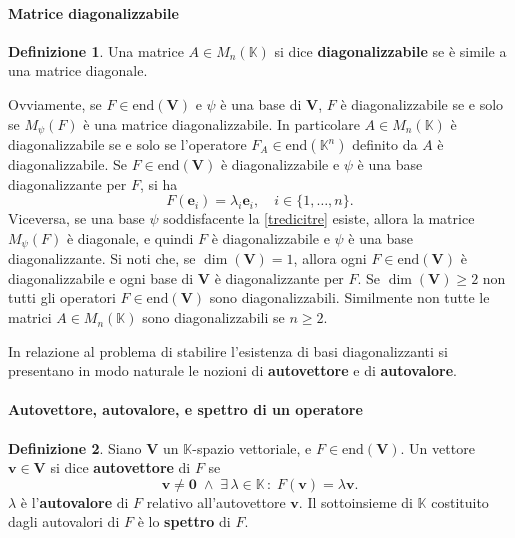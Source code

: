 \documentclass{article}
\theoremstyle{plain}
\theoremstyle{definition}
\newtheorem{defn}{Definizione}[section]
\theoremstyle{remark}
\begin{document}
\vspace{10pt}

\paragraph{Matrice diagonalizzabile}
\begin{bxthm}
\begin{defn}
Una matrice \( A \in M_n(\mathbb{K}) \) si dice \textbf{diagonalizzabile} se è simile a una matrice diagonale.
\end{defn}
\end{bxthm}

\vspace{10pt}

Ovviamente, se \( F \in \mathrm{end}(\mathbf{V}) \) e \( \psi \) è una base di \( \mathbf{V} \), 
\( F \) è diagonalizzabile se e solo se \( M_\psi(F) \) è una matrice diagonalizzabile. 
In particolare \( A \in M_n(\mathbb{K}) \) è diagonalizzabile se e solo se l'operatore 
\( F_A \in\mathrm{end}(\mathbb{K}^n) \) definito da \( A \) è diagonalizzabile.
Se \( F \in \mathrm{end}(\mathbf{V}) \) è diagonalizzabile e 
\( \psi \) è una base diagonalizzante per \( F \), si ha
\begin{equation}\label{tredicitre}
F(\mathbf{e}_i) = \lambda_i \mathbf{e}_i, \quad i \in \{1, \ldots, n\}.
\end{equation}
Viceversa, se una base \( \psi \) soddisfacente la \ref{tredicitre} esiste, allora la matrice \( M_\psi(F) \) è diagonale, 
e quindi \( F \) è diagonalizzabile e \( \psi \) è una base diagonalizzante. Si noti che, se \( \dim(\mathbf{V}) = 1 \), allora ogni \( F \in \mathrm{end}(\mathbf{V}) \) è diagonalizzabile e ogni 
base di \( \mathbf{V} \) è diagonalizzante per \( F \). Se \( \dim(\mathbf{V}) \geq 2 \) non tutti gli operatori \( F \in \mathrm{end}(\mathbf{V}) \) 
sono diagonalizzabili. Similmente non tutte le matrici \( A \in M_n(\mathbb{K}) \) sono diagonalizzabili se \( n \geq 2 \).

\vspace{10pt}

In relazione al problema di stabilire l'esistenza di basi diagonalizzanti si presentano in modo naturale le nozioni di \textbf{autovettore} e di \textbf{autovalore}.

\vspace{10pt}

\paragraph{Autovettore, autovalore, e spettro di un operatore}
\begin{bxthm}
\begin{defn}
Siano $\mathbf{V}$ un $\mathbb{K}$-spazio vettoriale, e $F \in \mathrm{end}(\mathbf{V})$. 
Un vettore $\mathbf{v} \in \mathbf{V}$ si dice \textbf{autovettore} di $F$ se 
\[\mathbf{v} \neq \mathbf{0}\;\land\;\exists\,\lambda \in \mathbb{K}\,:\;F(\mathbf{v}) = \lambda \mathbf{v}.\]
$\lambda$ è l'\textbf{autovalore} di $F$ relativo all'autovettore $\mathbf{v}$.
Il sottoinsieme di $\mathbb{K}$ costituito dagli autovalori di $F$ è lo \textbf{spettro} di $F$.
\end{defn}
\end{bxthm}
\end{document}
